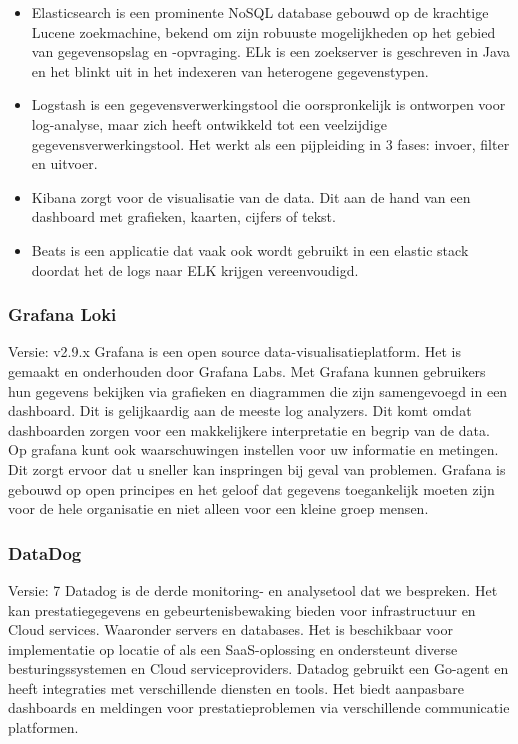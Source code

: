 \begin{itemize}
    \item Elasticsearch is een prominente \newline NoSQL database gebouwd op de krachtige Lucene zoekmachine, bekend om zijn \newline robuuste mogelijkheden op het gebied van gegevensopslag en -opvraging. ELk is een zoekserver is geschreven in Java en het blinkt uit in het indexeren van heterogene gegevenstypen.~\autocite{GedalBer}
    \item Logstash is een gegevensverwerkingstool die oorspronkelijk is ontworpen voor log-analyse, maar zich heeft ontwikkeld tot een veelzijdige gegevensverwerkingstool. Het werkt als een pijpleiding in 3 fases: invoer, filter en uitvoer. ~\autocite{Jamie2017,JugensToit}
    \item Kibana zorgt voor de visualisatie van de data. Dit aan de hand van een dashboard met grafieken, kaarten, cijfers of tekst.~\autocite{DavidTaylor2}
    \item Beats is een applicatie dat vaak ook wordt gebruikt in een elastic stack doordat het de logs naar ELK krijgen vereenvoudigd. \newline ~\autocite{objectrocket}
\end{itemize}

\subsubsection{Grafana Loki}
Versie: v2.9.x \newline
Grafana is een open source data\newline -visualisatieplatform. Het is gemaakt en onderhouden door Grafana Labs. Met Grafana kunnen gebruikers hun gegevens bekijken via grafieken en diagrammen die zijn samengevoegd in een dashboard. Dit is gelijkaardig aan de meeste log analyzers. Dit komt omdat dashboarden zorgen voor een makkelijkere interpretatie en begrip van de data. Op grafana kunt ook waarschuwingen instellen voor uw informatie en metingen. Dit zorgt ervoor dat u sneller kan inspringen bij geval van problemen. Grafana is gebouwd op open principes en het geloof dat gegevens toegankelijk moeten zijn voor de hele organisatie en niet alleen voor een kleine groep mensen. \autocite{RedHat2022,Grigor2023}

\subsubsection{DataDog}
Versie: 7 \newline
Datadog is de derde monitoring- en analysetool dat we bespreken. Het kan prestatiegegevens en gebeurtenisbewaking bieden voor infrastructuur en Cloud services. Waaronder servers en databases. Het is beschikbaar voor implementatie op locatie of als een SaaS-oplossing en ondersteunt diverse besturingssystemen en Cloud serviceproviders. Datadog gebruikt een Go-agent en heeft integraties met verschillende diensten en tools. Het biedt aanpasbare dashboards en meldingen voor prestatieproblemen via verschillende communicatie platformen. \autocite{DataDog2021}

